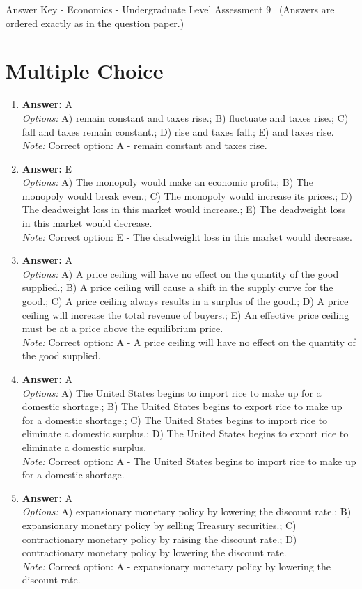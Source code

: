 \documentclass[12pt]{article}
\begin{document}
\begin{center}
Answer Key - Economics - Undergraduate Level Assessment 9 \
\small (Answers are ordered exactly as in the question paper.)
\end{center}

\section*{Multiple Choice}
\begin{enumerate}[label=\arabic*.]
\item \textbf{Answer:} A
\\ \textit{Options:} A) remain constant and taxes rise.; B) fluctuate and taxes rise.; C) fall and taxes remain constant.; D) rise and taxes fall.; E) and taxes rise.
\\ \textit{Note:} Correct option: A - remain constant and taxes rise.
\item \textbf{Answer:} E
\\ \textit{Options:} A) The monopoly would make an economic profit.; B) The monopoly would break even.; C) The monopoly would increase its prices.; D) The deadweight loss in this market would increase.; E) The deadweight loss in this market would decrease.
\\ \textit{Note:} Correct option: E - The deadweight loss in this market would decrease.
\item \textbf{Answer:} A
\\ \textit{Options:} A) A price ceiling will have no effect on the quantity of the good supplied.; B) A price ceiling will cause a shift in the supply curve for the good.; C) A price ceiling always results in a surplus of the good.; D) A price ceiling will increase the total revenue of buyers.; E) An effective price ceiling must be at a price above the equilibrium price.
\\ \textit{Note:} Correct option: A - A price ceiling will have no effect on the quantity of the good supplied.
\item \textbf{Answer:} A
\\ \textit{Options:} A) The United States begins to import rice to make up for a domestic shortage.; B) The United States begins to export rice to make up for a domestic shortage.; C) The United States begins to import rice to eliminate a domestic surplus.; D) The United States begins to export rice to eliminate a domestic surplus.
\\ \textit{Note:} Correct option: A - The United States begins to import rice to make up for a domestic shortage.
\item \textbf{Answer:} A
\\ \textit{Options:} A) expansionary monetary policy by lowering the discount rate.; B) expansionary monetary policy by selling Treasury securities.; C) contractionary monetary policy by raising the discount rate.; D) contractionary monetary policy by lowering the discount rate.
\\ \textit{Note:} Correct option: A - expansionary monetary policy by lowering the discount rate.
\end{enumerate}
\end{document}
